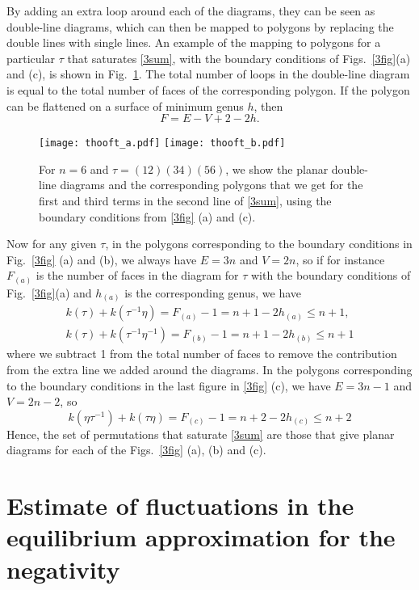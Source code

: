 \documentclass[a4paper,11pt]{article}
\newcommand{\be}{\begin{equation}}
\newcommand{\ee}{\end{equation}}
\begin{document}
\begin{enumerate}
\begin{appendix}
By adding an extra loop around each of the diagrams, they can be seen as double-line diagrams, which can then be mapped to polygons by replacing the double lines with single lines. An example of the mapping to polygons for a particular $\tau$ that saturates \eqref{3sum}, with the boundary conditions of Figs.~\ref{3fig}(a) and (c), is shown in Fig.~\ref{fig:thooft}. The total number of loops in the double-line diagram is equal to the total number of faces of the corresponding polygon. If the polygon can be flattened on a surface of minimum genus $h$, then 
\be 
F = E-V +2 - 2h. 
\ee
\begin{figure}[]
\centering
\texttt{[image: thooft\_a.pdf]}
\texttt{[image: thooft\_b.pdf]}
\caption{For $n=6$ and $\tau=(12)(34)(56)$, we show the planar double-line diagrams and the corresponding polygons that we get for the first and third terms in the second line of \eqref{3sum}, using the boundary conditions from \eqref{3fig} (a) and (c).}
\label{fig:thooft}
\end{figure}
Now for any given $\tau$, in the polygons corresponding to the boundary conditions in Fig.~\ref{3fig} (a) and (b), we always have $E = 3n$ and $V = 2n$, so if for instance $F_{(a)}$ is the number of faces in the diagram for $\tau$ with the boundary conditions of Fig.~\ref{3fig}(a) and $h_{(a)}$ is the corresponding genus, we have 
\be 
\begin{gathered} 
k(\tau) + k(\tau^{-1} \eta) = F_{(a)}-1 = n+ 1- 2h_{(a)} \leq n+1, \\
 k(\tau) + k(\tau^{-1} \eta^{-1}) = F_{(b)}-1 = n+ 1- 2h_{(b)} \leq n+1
\end{gathered} 
\ee
where we subtract 1 from the total number of faces to remove the contribution from the extra line we added around the diagrams.
In the polygons corresponding to the boundary conditions in the last figure in \ref{3fig} (c), we have $E = 3n -1$ and $V = 2n -2$, so 
\be 
k(\eta \tau^{-1}) + k(\tau \eta) = F_{(c)}-1 = n +2 - 2h_{(c)} \leq n+2
\ee
Hence, the set of permutations that saturate \eqref{3sum} are those that give planar diagrams for each of the Figs.~\ref{3fig} (a), (b) and (c). 

\section{Estimate of fluctuations in the equilibrium approximation for the negativity}
\label{app:fluctuations}


\end{appendix}
\end{enumerate}
\end{document}
